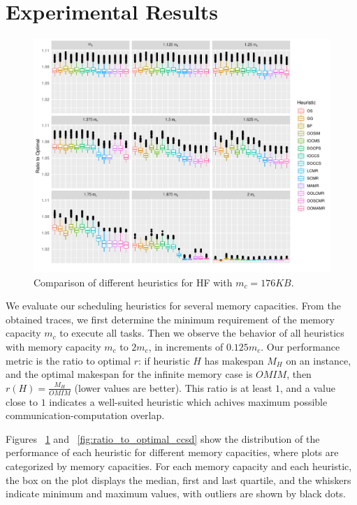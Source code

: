 \documentclass[runningheads]{llncs} %
\begin{document}
	
	\section{Experimental Results}
	\label{sec:expResults}
	
		\begin{figure}[htb]
		\includegraphics[scale=0.5]{./ratio_to_optimal_hf.pdf}
		\caption{Comparison of different heuristics for HF with $m_c=176KB$.}
		\label{fig:ratio_to_optimal_hf}
		\end{figure}	
		We evaluate our scheduling heuristics for several memory capacities. From the obtained traces, we first determine the minimum requirement of the memory capacity $m_c$ to execute all tasks. Then we observe the behavior of all heuristics with memory capacity $m_c$ to $2m_c$, in increments of $0.125m_c$. Our performance metric is the ratio to optimal $r$: if heuristic $H$ has makespan $M_H$ on an instance, and the optimal makespan for the infinite memory case is $OMIM$, then $r(H)=\frac{M_H}{OMIM}$ (lower values are better). This ratio is at least $1$, and a value close to $1$ indicates a well-suited  heuristic which achives maximum possible communication-computation overlap.

Figures ~\ref{fig:ratio_to_optimal_hf} and ~\ref{fig:ratio_to_optimal_ccsd} show the distribution of the performance of each heuristic for different memory capacities, where plots are categorized by memory capacities. For each memory capacity and each heuristic, the box on the plot displays the median, first and last quartile, and the whiskers indicate minimum and maximum values, with outliers are shown by black dots.
\end{document}
